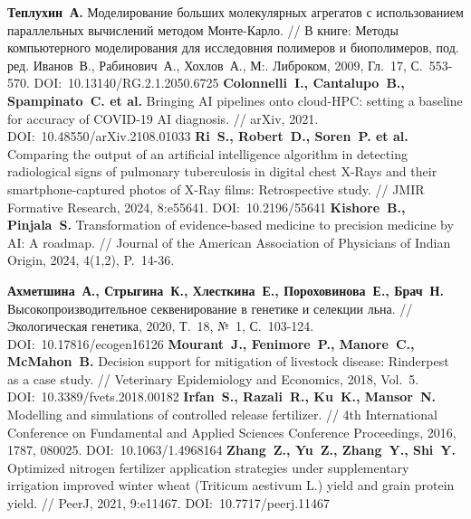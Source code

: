 \begin{thebibliography}{99}
\textbf{Теплухин~А.} Моделирование больших молекулярных агрегатов с использованием параллельных вычислений методом Монте-Карло. // В книге: Методы компьютерного моделирования для исследовния полимеров и биополимеров, под. ред. Иванов~В., Рабинович~А., Хохлов~А., М:. Либроком, 2009, Гл.~17, С.~553-570. DOI:~10.13140/RG.2.1.2050.6725
\textbf{Colonnelli~I., Cantalupo~B., Spampinato~C. et al.} Bringing AI pipelines onto cloud-HPC: setting a baseline for accuracy of COVID-19 AI diagnosis. // arXiv, 2021. DOI:~10.48550/arXiv.2108.01033
\textbf{Ri~S., Robert~D., Soren~P. et al.} Comparing the output of an artificial intelligence algorithm in detecting radiological signs of pulmonary tuberculosis in digital chest X-Rays and their smartphone-captured photos of X-Ray films: Retrospective study. // JMIR Formative Research, 2024, 8:e55641. DOI:~10.2196/55641
\textbf{Kishore~B., Pinjala~S.} Transformation of evidence-based medicine to precision medicine by AI: A roadmap. // Journal of the American Association of Physicians of Indian Origin, 2024, 4(1,2), P.~14-36.

\textbf{Ахметшина~А., Стрыгина~К., Хлесткина~Е., Пороховинова~Е., Брач~Н.} Высокопроизводительное секвенирование в генетике и селекции льна. // Экологическая генетика, 2020, Т.~18, №~1, С.~103-124. DOI:~10.17816/ecogen16126
\textbf{Mourant~J., Fenimore~P., Manore~C., McMahon~B.} Decision support for mitigation of livestock disease: Rinderpest as a case study. // Veterinary Epidemiology and Economics, 2018, Vol.~5. DOI:~10.3389/fvets.2018.00182
\textbf{Irfan~S., Razali~R., Ku~K., Mansor~N.} Modelling and simulations of controlled release fertilizer. // 4th International Conference on Fundamental and Applied Sciences Conference Proceedings, 2016, 1787, 080025. DOI:~10.1063/1.4968164
\textbf{Zhang~Z., Yu~Z., Zhang~Y., Shi~Y.} Optimized nitrogen fertilizer application strategies under supplementary irrigation improved winter wheat (Triticum aestivum L.) yield and grain protein yield. // PeerJ, 2021, 9:e11467. DOI:~10.7717/peerj.11467


\end{thebibliography}
